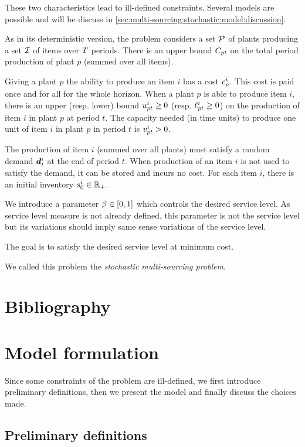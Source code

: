 These two characteristics lead to ill-defined constraints.
Several models are possible and will be discuss in \cref{sec:multi-sourcing:stochastic:model:discussion}.


\medskip


As in its deterministic version, the problem considers a set $\mathcal{P}$ of plants producing a set $\mathcal{I}$ of items over $T$ periods.
There is an upper bound $C_{pt}$ on the total period production of plant $p$ (summed over all items).

Giving a plant $p$ the ability to produce an item $i$ has a cost $c_p^i$.
This cost is paid once and for all for the whole horizon.
When a plant $p$ is able to produce item $i$, there is an upper (resp. lower) bound $u_{pt}^i\ge 0$ (resp. $\ell_{pt}^i\ge 0$) on the production of item $i$ in plant $p$ at period $t$.
The capacity needed (in time units) to produce one unit of item $i$ in plant $p$ in period $t$ is $v_{pt}^i>0$.


The production of item $i$ (summed over all plants) must satisfy a random demand $\va\demand_t^i$ at the end of period $t$.
When production of an item $i$ is not used to satisfy the demand, it can be stored and incurs no cost.
For each item $i$, there is an initial inventory $s_0^i\in\mathbb{R}_+$.


We introduce a parameter $\servicelvl\in\sqbracket{0,1}$ which controls the desired service level.
As service level measure is not already defined, this parameter is not the service level but its variations should imply same sense variations of the service level.


The goal is to satisfy the desired service level at minimum cost.


We called this problem the \emph{stochastic multi-sourcing problem}.


\section{Bibliography}


\section{Model formulation}


Since some constraints of the problem are ill-defined, we first introduce preliminary definitions, then we present the model and finally discuss the choices made.


\subsection{Preliminary definitions}


